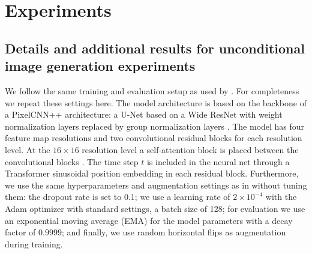 \section{Experiments}
\label{sec:appendix_experiments}

\subsection{Details and additional results for unconditional image generation experiments}
\label{sec:appendix_image}

 We follow the same training and evaluation setup as used by \citet{ho2020denoising}. For completeness we repeat these settings here. The model architecture is based on the backbone of a PixelCNN++ \citep{salimans2017pixelcnn++} architecture: a U-Net \citep{ronneberger2015unet} based on a Wide ResNet \citep{zagoruyko2016wide} with weight normalization layers \citep{salimans2016weight} replaced by group normalization layers \citep{wu2018group}. The model has four feature map resolutions and two convolutional residual blocks for each resolution level. At the $16\times 16$ resolution level a self-attention block is placed between the convolutional blocks \citep{chen2018pixelsnail}. The time step $t$ is included in the neural net through a Transformer sinusoidal position embedding \citep{vaswani2017attention} in each residual block. 
Furthermore, we use the same hyperparameters and augmentation settings as in \citep{ho2020denoising} without tuning them: the dropout rate is set to 0.1; we use a learning rate of $2\times 10^{-4}$ with the Adam optimizer \citep{kingma2014adam} with standard settings, a batch size of 128; for evaluation we use an exponential moving average (EMA) for the model parameters with a decay factor of $0.9999$; and finally, we use random horizontal flips as augmentation during training.

